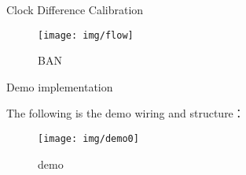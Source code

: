 \begin{frame}[fragile]{Clock Difference Calibration}

  \begin{figure}[htbp]
  \begin{center}
  \texttt{[image: img/flow]}
  \caption{BAN }
  \label{Overview}
  \end{center}
  \vspace{-0.5em}
  \end{figure}

\end{frame}






\begin{frame}[fragile]{Demo implementation}

The following is the demo wiring and structure：
\begin{figure}[htbp]
\begin{center}
\texttt{[image: img/demo0]}
\caption{demo}
\label{Overview}
\end{center}
\vspace{-0.5em}
\end{figure}

\end{frame}

